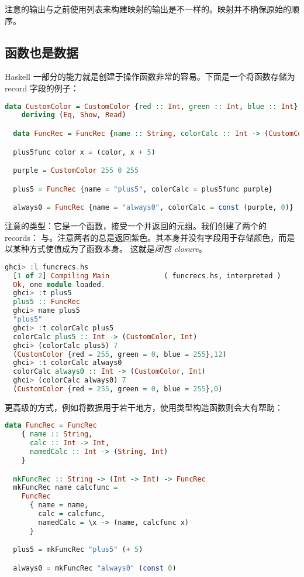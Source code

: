 \documentclass[./main.tex]{subfiles}
\begin{document}
注意的输出与之前使用列表来构建映射的输出是不一样的。映射并不确保原始的顺序。

\subsection*{函数也是数据}

Haskell 一部分的能力就是创建于操作函数非常的容易。下面是一个将函数存储为 record 字段的例子：

\begin{lstlisting}[language=Haskell]
  data CustomColor = CustomColor {red :: Int, green :: Int, blue :: Int}
    deriving (Eq, Show, Read)

  data FuncRec = FuncRec {name :: String, colorCalc :: Int -> (CustomColor, Int)}

  plus5func color x = (color, x + 5)

  purple = CustomColor 255 0 255

  plus5 = FuncRec {name = "plus5", colorCalc = plus5func purple}

  always0 = FuncRec {name = "always0", colorCalc = const (purple, 0)}
\end{lstlisting}

注意的类型：它是一个函数，接受一个并返回的元组。我们创建了两个的 records：
与。注意两者的总是返回紫色。其本身并没有字段用于存储颜色，而是以某种方式使值成为了函数本身。
这就是\textit{闭包 closure}。

\begin{lstlisting}[language=Haskell]
  ghci> :l funcrecs.hs
  [1 of 2] Compiling Main             ( funcrecs.hs, interpreted )
  Ok, one module loaded.
  ghci> :t plus5
  plus5 :: FuncRec
  ghci> name plus5
  "plus5"
  ghci> :t colorCalc plus5
  colorCalc plus5 :: Int -> (CustomColor, Int)
  ghci> (colorCalc plus5) 7
  (CustomColor {red = 255, green = 0, blue = 255},12)
  ghci> :t colorCalc always0
  colorCalc always0 :: Int -> (CustomColor, Int)
  ghci> (colorCalc always0) 7
  (CustomColor {red = 255, green = 0, blue = 255},0)
\end{lstlisting}

更高级的方式，例如将数据用于若干地方，使用类型构造函数则会大有帮助：

\begin{lstlisting}[language=Haskell]
  data FuncRec = FuncRec
    { name :: String,
      calc :: Int -> Int,
      namedCalc :: Int -> (String, Int)
    }

  mkFuncRec :: String -> (Int -> Int) -> FuncRec
  mkFuncRec name calcfunc =
    FuncRec
      { name = name,
        calc = calcfunc,
        namedCalc = \x -> (name, calcfunc x)
      }

  plus5 = mkFuncRec "plus5" (+ 5)

  always0 = mkFuncRec "always0" (const 0)
\end{lstlisting}
\end{document}
